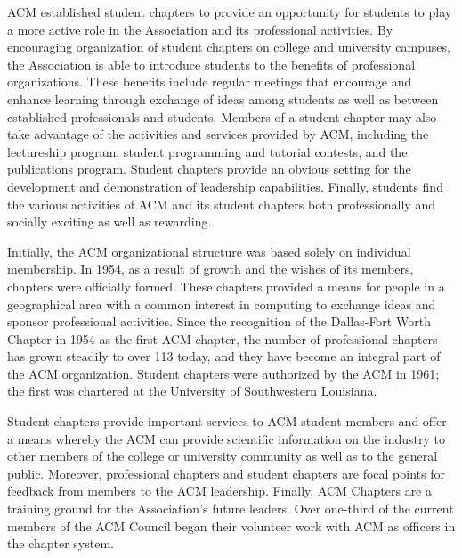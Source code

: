 ACM established student chapters to provide an opportunity for students to play
a more active role in the Association and its professional activities. By
encouraging organization of student chapters on college and university campuses,
the Association is able to introduce students to the benefits of professional
organizations. These benefits include regular meetings that encourage and enhance
learning through exchange of ideas among students as well as between established
professionals and students. Members of a student chapter may also take advantage
of the activities and services provided by ACM, including the lectureship program,
student programming and tutorial contests, and the publications program. Student
chapters provide an obvious setting for the development and demonstration of
leadership capabilities. Finally, students find the various activities of ACM
and its student chapters both professionally and socially exciting as well as
rewarding.

Initially, the ACM organizational structure was based solely on individual
membership. In 1954, as a result of growth and the wishes of its members,
chapters were officially formed. These chapters provided a means for people in
a geographical area with a common interest in computing to exchange ideas and
sponsor professional activities. Since the recognition of the Dallas-Fort Worth
Chapter in 1954 as the first ACM chapter, the number of professional chapters
has grown steadily to over 113 today, and they have become an integral part of
the ACM organization. Student chapters were authorized by the ACM in 1961; the
first was chartered at the University of Southwestern Louisiana.

Student chapters provide important services to ACM student members and offer a
means whereby the ACM can provide scientific information on the industry to
other members of the college or university community as well as to the general
public. Moreover, professional chapters and student chapters are focal points
for feedback from members to the ACM leadership. Finally, ACM Chapters are a
training ground for the Association's future leaders. Over one-third of the
current members of the ACM Council began their volunteer work with ACM as
officers in the chapter system.

